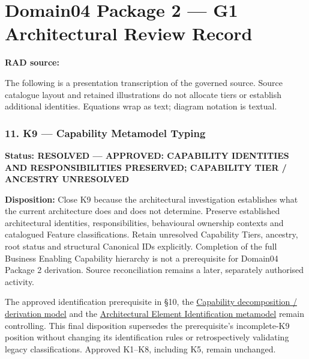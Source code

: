 \chapter{Domain04 Package 2 — G1 Architectural Review Record}\label{rad:k9}
\noindent\textbf{RAD source:} \texttt{}

The following is a presentation transcription of the governed source. Source catalogue layout and retained illustrations do not allocate tiers or establish additional identities. Equations wrap as text; diagram notation is textual.

\label{rad:k9:1392}
\subsection*{11. K9 — Capability Metamodel Typing}
\label{rad:k9:1394}

\textbf{Status: RESOLVED — APPROVED: CAPABILITY IDENTITIES AND RESPONSIBILITIES PRESERVED; CAPABILITY TIER /\allowbreak{} ANCESTRY UNRESOLVED}

\label{rad:k9:1396}

\textbf{Disposition:} Close K9 because the architectural investigation establishes what the current architecture does and does not determine. Preserve established architectural identities, responsibilities, behavioural ownership contexts and catalogued Feature classifications. Retain unresolved Capability Tiers, ancestry, root status and structural Canonical IDs explicitly. Completion of the full Business Enabling Capability hierarchy is not a prerequisite for Domain04 Package 2 derivation. Source reconciliation remains a later, separately authorised activity.

\label{rad:k9:1398}

The approved identification prerequisite in §10, the \hyperref[rad:tier-model]{Capability decomposition /\allowbreak{} derivation model} and the \hyperref[rad:metamodel:319]{Architectural Element Identification metamodel} remain controlling. This final disposition supersedes the prerequisite's incomplete-K9 position without changing its identification rules or retrospectively validating legacy classifications. Approved K1–K8, including K5, remain unchanged.

